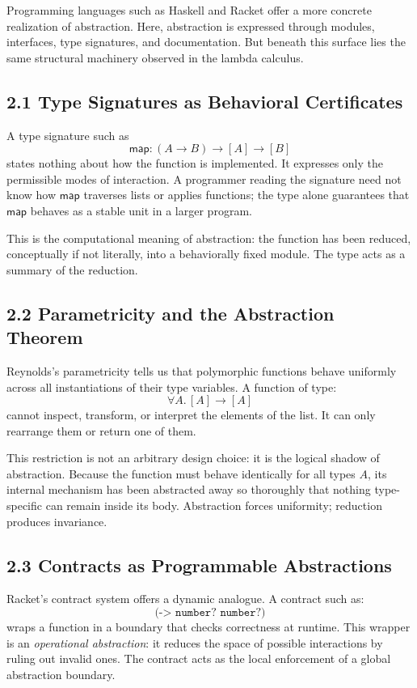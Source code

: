 \documentclass[12pt,letterpaper]{article}
\begin{document}
Programming languages such as Haskell and Racket offer a more concrete realization of abstraction. Here, abstraction is expressed through modules, interfaces, type signatures, and documentation. But beneath this surface lies the same structural machinery observed in the lambda calculus.

\subsection{2.1 Type Signatures as Behavioral Certificates}

A type signature such as
\[
\mathsf{map} : (A \to B) \to [A] \to [B]
\]
states nothing about how the function is implemented. It expresses only the permissible modes of interaction. A programmer reading the signature need not know how \(\mathsf{map}\) traverses lists or applies functions; the type alone guarantees that \(\mathsf{map}\) behaves as a stable unit in a larger program.

This is the computational meaning of abstraction: the function has been reduced, conceptually if not literally, into a behaviorally fixed module. The type acts as a summary of the reduction.

\subsection{2.2 Parametricity and the Abstraction Theorem}

Reynolds’s parametricity tells us that polymorphic functions behave uniformly across all instantiations of their type variables. A function of type:
\[
\forall A.\, [A] \to [A]
\]
cannot inspect, transform, or interpret the elements of the list. It can only rearrange them or return one of them.

This restriction is not an arbitrary design choice: it is the logical shadow of abstraction. Because the function must behave identically for all types \(A\), its internal mechanism has been abstracted away so thoroughly that nothing type-specific can remain inside its body. Abstraction forces uniformity; reduction produces invariance.

\subsection{2.3 Contracts as Programmable Abstractions}

Racket's contract system offers a dynamic analogue. A contract such as:
\[
\texttt{(-> number? number?)}
\]
wraps a function in a boundary that checks correctness at runtime. This wrapper is an \emph{operational abstraction}: it reduces the space of possible interactions by ruling out invalid ones. The contract acts as the local enforcement of a global abstraction boundary.
\end{document}
